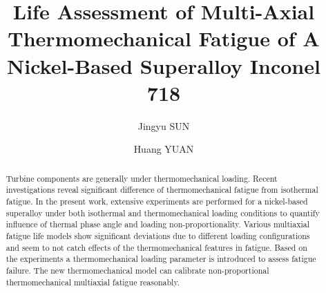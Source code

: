 \documentclass[preprint,5p,twocolumn,11pt,sort&compress]{elsarticle}
\begin{document}



\begin{frontmatter}



\title{Life Assessment of Multi-Axial Thermomechanical Fatigue of A Nickel-Based Superalloy Inconel 718}


\author{Jingyu SUN}
\author{Huang YUAN}

\address[label1]{School of Aerospace Engineering, Tsinghua University, Beijing, China}
\address[label2]{Department of Civil Engineering, Technical University of Darmstadt, Germany}

\begin{abstract}

Turbine components are generally under thermomechanical loading. Recent investigations reveal significant difference of thermomechanical fatigue from isothermal fatigue. In the present work, extensive experiments are performed for a nickel-based superalloy under both isothermal and thermomechanical loading conditions to quantify influence of thermal phase angle and loading non-proportionality. Various multiaxial fatigue life models show significant deviations due to different loading configurations and seem to not catch effects of the thermomechanical features in fatigue. Based on the experiments a thermomechanical loading parameter is introduced to assess fatigue failure. The new thermomechanical model can  calibrate non-proportional thermomechanical multiaxial fatigue reasonably.


\end{abstract}
\end{frontmatter}
\end{document}
